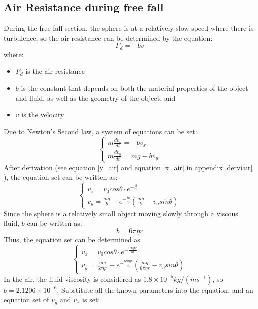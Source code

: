\documentclass{article}
\begin{document}
        
    \subsection{Air Resistance during free fall}
During the free fall section, the sphere is at a relatively slow speed where there is turbulence, so the air resistance can be determined by the equation:
\begin{equation}
    F_d = -bv
\end{equation}
where:
\begin{itemize}
    \item $F_d$ is the air resistance
    \item $b$ is the constant that depends on both the material properties of the object and fluid, as well as the geometry of the object, and
    \item $v$ is the velocity
\end{itemize}
Due to Newton's Second law, a system of equations can be set:
\begin{equation*}
    \begin{cases}
    m\frac{dv_x}{dt} = -bv_x\\
    m\frac{dv_y}{dt} = mg-bv_y
    \end{cases}
\end{equation*}
After derivation (see equation \ref{y_air} and equation \ref{x_air} in appendix \ref{derviair} ), the equation set can be written as:
\begin{equation*}
    \begin{cases}
    v_x = v_0cos\theta\cdot e^{-\frac{bt}{m}}\\
    v_y = \frac{mg}{b} - e^{-\frac{tb}{m}}(\frac{mg}{b}-v_osin\theta)
    \end{cases}
\end{equation*}
Since the sphere is a relatively small object moving slowly through a viscous fluid, $b$ can be written as:
\begin{equation}
    b = 6\pi\eta r \nonumber
\end{equation}
Thus, the equation set can be determined as
\begin{equation}
   \begin{cases}
       v_x = v_0 cos\theta\cdot e^{-\frac{6\pi\eta tr}{m}}\\
       v_y = \frac{mg}{6\pi\eta r} - e^{-\frac{6t\pi\eta r}{m}}(\frac{mg}{6\pi\eta r}-v_osin\theta)
   \end{cases} 
\end{equation}
In the air, the fluid viscosity is considered as $1.8\times10^{-5}kg/(ms^{-1})$, so $b = 2.1206\times 10^{-6}$. Substitute all the known parameters into the equation, and an equation set of $v_y$ and $v_x$ is set:
\end{document}
